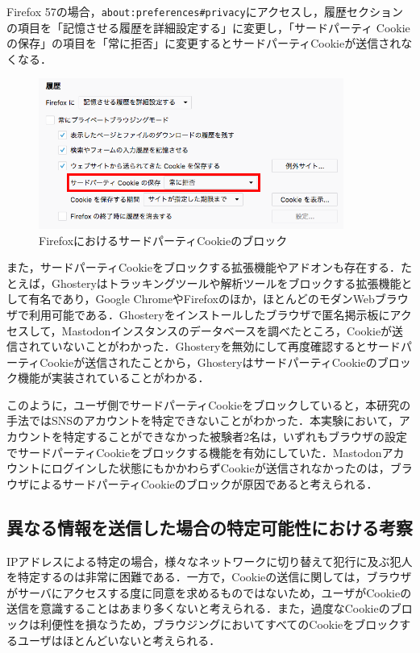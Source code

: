 \documentclass[10pt, a4paper]{jreport}
\begin{document}
\noindent
Firefox 57の場合，\verb|about:preferences#privacy|にアクセスし，履歴セクションの項目を「記憶させる履歴を詳細設定する」に変更し，「サードパーティ Cookie の保存」の項目を「常に拒否」に変更するとサードパーティCookieが送信されなくなる\cite{how_to_disable_third_party_cookie_on_firefox}．

\begin{figure}[H]
	\begin{center}
		\includegraphics[width=100mm]{figures/disable_third_party_cookie_on_firefox.png}
	\end{center}
	\caption{FirefoxにおけるサードパーティCookieのブロック}
	\label{fig: disable_third_party_cookie_on_firefox}
\end{figure}

また，サードパーティCookieをブロックする拡張機能やアドオンも存在する．たとえば，Ghosteryはトラッキングツールや解析ツールをブロックする拡張機能として有名であり，Google ChromeやFirefoxのほか，ほとんどのモダンWebブラウザで利用可能である\cite{ghostery}．Ghosteryをインストールしたブラウザで匿名掲示板にアクセスして，Mastodonインスタンスのデータベースを調べたところ，Cookieが送信されていないことがわかった．Ghosteryを無効にして再度確認するとサードパーティCookieが送信されたことから，GhosteryはサードパーティCookieのブロック機能が実装されていることがわかる．

このように，ユーザ側でサードパーティCookieをブロックしていると，本研究の手法ではSNSのアカウントを特定できないことがわかった．本実験において，アカウントを特定することができなかった被験者2名は，いずれもブラウザの設定でサードパーティCookieをブロックする機能を有効にしていた．Mastodonアカウントにログインした状態にもかかわらずCookieが送信されなかったのは，ブラウザによるサードパーティCookieのブロックが原因であると考えられる．

\subsection{異なる情報を送信した場合の特定可能性における考察}
IPアドレスによる特定の場合，様々なネットワークに切り替えて犯行に及ぶ犯人を特定するのは非常に困難である．一方で，Cookieの送信に関しては，ブラウザがサーバにアクセスする度に同意を求めるものではないため，ユーザがCookieの送信を意識することはあまり多くないと考えられる．また，過度なCookieのブロックは利便性を損なうため，ブラウジングにおいてすべてのCookieをブロックするユーザはほとんどいないと考えられる．
\end{document}
